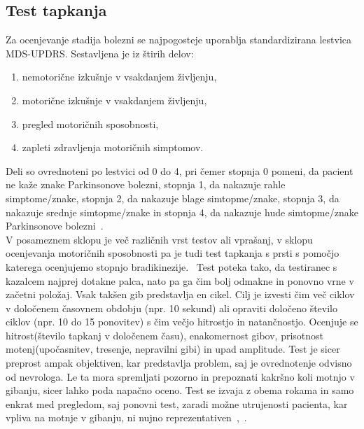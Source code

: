 \documentclass[a4paper,12pt]{article}
\begin{document}
\subsection{Test tapkanja}

Za ocenjevanje stadija bolezni se najpogosteje uporablja standardizirana lestvica MDS-UPDRS. Sestavljena je 
iz štirih delov:

\begin{enumerate}
    \item nemotorične izkušnje v vsakdanjem življenju,
    \item motorične izkušnje v vsakdanjem življenju,
    \item pregled motoričnih sposobnosti,
    \item zapleti zdravljenja motoričnih simptomov.
\end{enumerate}

Deli so ovrednoteni po lestvici od 0 do 4, pri čemer stopnja 0 pomeni, da pacient ne kaže znake Parkinsonove 
bolezni, stopnja 1, da nakazuje rahle simptome/znake, stopnja 2, da nakazuje blage simtopme/znake, 
stopnja 3, da nakazuje srednje simtopme/znake in stopnja 4, da nakazuje hude simtopme/znake Parkinsonove 
bolezni~\cite{Goetz}.\\

V posameznem sklopu je več različnih vrst testov ali vprašanj, v sklopu ocenjevanja motoričnih sposobnosti pa je 
tudi test tapkanja s prsti s pomočjo katerega ocenjujemo stopnjo bradikinezije. \
Test poteka tako, da testiranec s kazalcem najprej dotakne palca, nato pa ga čim bolj odmakne in ponovno vrne 
v začetni položaj. Vsak takšen gib predstavlja en cikel. Cilj je izvesti čim več ciklov v določenem časovnem 
obdobju (npr. 10 sekund) ali opraviti določeno število ciklov (npr. 10 do 15 ponovitev) s čim večjo hitrostjo in 
natančnostjo. Ocenjuje se hitrost(število tapkanj v določenem času), enakomernost gibov, prisotnost 
motenj(upočasnitev, tresenje, nepravilni gibi) in upad amplitude. Test je sicer preprost ampak objektiven, 
kar predstavlja problem, saj je ovrednotenje odvisno od nevrologa. Le ta mora spremljati pozorno in 
prepoznati kakršno koli motnjo v gibanju, sicer lahko poda napačno oceno. Test se izvaja z obema rokama in 
samo enkrat med pregledom, saj ponovni test, zaradi možne utrujenosti pacienta, kar vpliva na motnje v 
gibanju, ni nujno reprezentativen~\cite{Goetz},~\cite{Khana}. 
\end{document}

